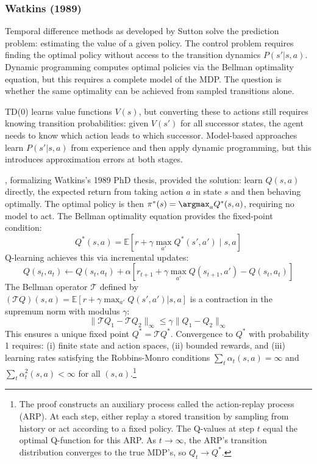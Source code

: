 \subsubsection{Watkins (1989)}

Temporal difference methods as developed by Sutton solve the prediction problem: estimating the value of a given policy. The control problem requires finding the optimal policy without access to the transition dynamics $P(s'|s,a)$. Dynamic programming computes optimal policies via the Bellman optimality equation, but this requires a complete model of the MDP. The question is whether the same optimality can be achieved from sampled transitions alone.

TD(0) learns value functions $V(s)$, but converting these to actions still requires knowing transition probabilities: given $V(s')$ for all successor states, the agent needs to know which action leads to which successor. Model-based approaches learn $P(s'|s,a)$ from experience and then apply dynamic programming, but this introduces approximation errors at both stages.

\citet{WatkinsDayan1992}, formalizing Watkins's 1989 PhD thesis, provided the solution: learn $Q(s,a)$ directly, the expected return from taking action $a$ in state $s$ and then behaving optimally. The optimal policy is then $\pi^*(s) = \argmax_a Q^*(s,a)$, requiring no model to act. The Bellman optimality equation provides the fixed-point condition:
\begin{equation}
Q^*(s,a) = \mathbb{E}\left[r + \gamma \max_{a'} Q^*(s',a') \mid s, a\right]
\end{equation}
Q-learning achieves this via incremental updates:
\begin{equation}
Q(s_t, a_t) \leftarrow Q(s_t, a_t) + \alpha \left[ r_{t+1} + \gamma \max_{a'} Q(s_{t+1}, a') - Q(s_t, a_t) \right]
\end{equation}
The Bellman operator $\mathcal{T}$ defined by $(\mathcal{T}Q)(s,a) = \mathbb{E}[r + \gamma \max_{a'} Q(s',a') | s,a]$ is a contraction in the supremum norm with modulus $\gamma$:
\begin{equation}
\|\mathcal{T}Q_1 - \mathcal{T}Q_2\|_\infty \leq \gamma \|Q_1 - Q_2\|_\infty
\end{equation}
This ensures a unique fixed point $Q^* = \mathcal{T}Q^*$. Convergence to $Q^*$ with probability 1 requires: (i) finite state and action spaces, (ii) bounded rewards, and (iii) learning rates satisfying the Robbins-Monro conditions $\sum_t \alpha_t(s,a) = \infty$ and $\sum_t \alpha_t^2(s,a) < \infty$ for all $(s,a)$.\footnote{The proof constructs an auxiliary process called the action-replay process (ARP). At each step, either replay a stored transition by sampling from history or act according to a fixed policy. The Q-values at step $t$ equal the optimal Q-function for this ARP. As $t \to \infty$, the ARP's transition distribution converges to the true MDP's, so $Q_t \to Q^*$.}

